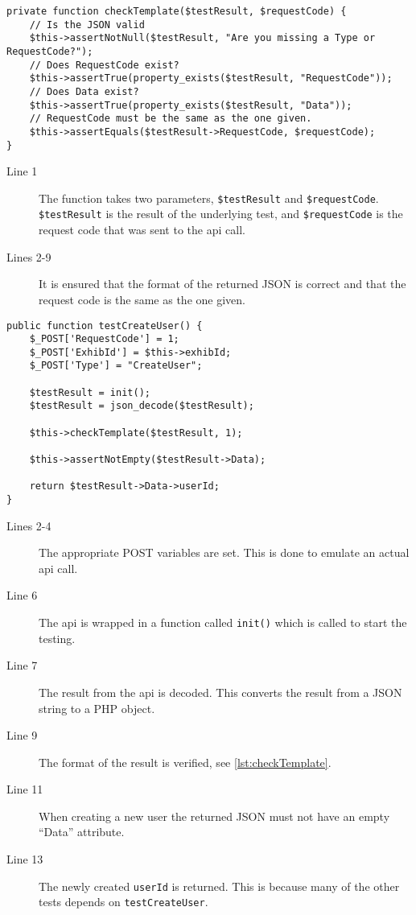 \begin{lstlisting}[language=phpstyle, label=lst:checkTemplate, caption={\lstinline|checkTemplate| unit test}]
private function checkTemplate($testResult, $requestCode) {
    // Is the JSON valid
    $this->assertNotNull($testResult, "Are you missing a Type or RequestCode?");
    // Does RequestCode exist?
    $this->assertTrue(property_exists($testResult, "RequestCode"));
    // Does Data exist?
    $this->assertTrue(property_exists($testResult, "Data"));    
    // RequestCode must be the same as the one given.
    $this->assertEquals($testResult->RequestCode, $requestCode);
}
\end{lstlisting}%
\begin{description}
\item[Line 1] The function takes two parameters, \lstinline|$testResult| and \lstinline|$requestCode|. \lstinline|$testResult| is the result of the underlying test, and \lstinline|$requestCode| is the request code that was sent to the \ac{api} call.
\item[Lines 2-9] It is ensured that the format of the returned JSON is correct and that the request code is the same as the one given. 
\end{description}

\begin{lstlisting}[language=phpstyle, label=lst:testCreateUser, caption={\lstinline|createUser| unit test}]
public function testCreateUser() {
    $_POST['RequestCode'] = 1;
    $_POST['ExhibId'] = $this->exhibId;
    $_POST['Type'] = "CreateUser";

    $testResult = init();
    $testResult = json_decode($testResult);

    $this->checkTemplate($testResult, 1);

    $this->assertNotEmpty($testResult->Data);
    
    return $testResult->Data->userId;      
}
\end{lstlisting}%
\begin{description}
\item[Lines 2-4] The appropriate POST variables are set. This is done to emulate an actual \ac{api} call.
\item[Line 6] The \ac{api} is wrapped in a function called \lstinline|init()| which is called to start the testing.
\item[Line 7] The result from the \ac{api} is decoded. This converts the result from a JSON string to a PHP object.
\item[Line 9] The format of the result is verified, see \autoref{lst:checkTemplate}.
\item[Line 11] When creating a new user the returned JSON must not have an empty ``Data'' attribute.
\item[Line 13] The newly created \lstinline|userId| is returned. This is because many of the other tests depends on \lstinline|testCreateUser|.
\end{description}

